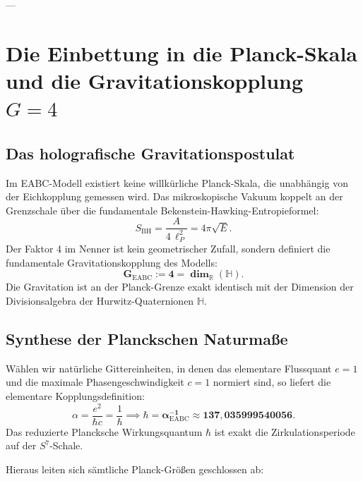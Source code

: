 \documentclass[11pt,a4paper]{article}
\theoremstyle{definition}
\theoremstyle{remark}
\numberwithin{equation}{section}
\begin{document}
---

\section{Die Einbettung in die Planck-Skala und die Gravitationskopplung $G = 4$}

\subsection{Das holografische Gravitationspostulat}

Im EABC-Modell existiert keine willkürliche Planck-Skala, die unabhängig von der Eichkopplung gemessen wird. Das mikroskopische Vakuum koppelt an der Grenzschale über die fundamentale Bekenstein-Hawking-Entropieformel:
\begin{equation}
S_{\mathrm{BH}} = \frac{A}{4\,\ell_P^2} = 4\pi \sqrt{E}.
\end{equation}
Der Faktor 4 im Nenner ist kein geometrischer Zufall, sondern definiert die fundamentale Gravitationskopplung des Modells:
\begin{equation}
\mathbf{G_{\mathrm{EABC}} := 4 = \dim_{\mathbb{R}}(\mathbb{H})}.
\end{equation}
Die Gravitation ist an der Planck-Grenze exakt identisch mit der Dimension der Divisionsalgebra der Hurwitz-Quaternionen $\mathbb{H}$.

\subsection{Synthese der Planckschen Naturmaße}

Wählen wir natürliche Gittereinheiten, in denen das elementare Flussquant $e = 1$ und die maximale Phasengeschwindigkeit $c = 1$ normiert sind, so liefert die elementare Kopplungsdefinition:
\begin{equation}
\alpha = \frac{e^2}{\hbar c} = \frac{1}{\hbar} \implies \mathbf{\hbar = \alpha^{-1}_{\mathrm{EABC}} \approx 137{,}035999540056}.
\end{equation}
Das reduzierte Plancksche Wirkungsquantum $\hbar$ ist exakt die Zirkulationsperiode auf der $S^7$-Schale.

Hieraus leiten sich sämtliche Planck-Größen geschlossen ab:
\end{document}
